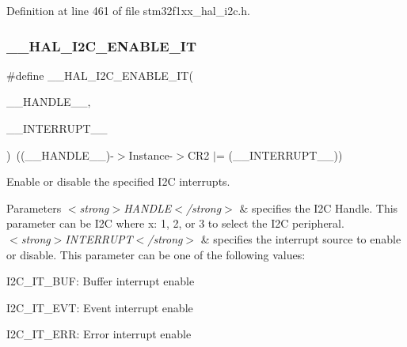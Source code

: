 Definition at line 461 of file stm32f1xx\+\_\+hal\+\_\+i2c.\+h.

\mbox{\label{group___i2_c___exported___macros_gac9d8b249b06b2d30f987acc9ceebd1d9}} 
\subsubsection{\texorpdfstring{\+\_\+\+\_\+\+H\+A\+L\+\_\+\+I2\+C\+\_\+\+E\+N\+A\+B\+L\+E\+\_\+\+IT}{\_\_HAL\_I2C\_ENABLE\_IT}}
{\footnotesize\ttfamily \#define \+\_\+\+\_\+\+H\+A\+L\+\_\+\+I2\+C\+\_\+\+E\+N\+A\+B\+L\+E\+\_\+\+IT(\begin{DoxyParamCaption}\item[{}]{\+\_\+\+\_\+\+H\+A\+N\+D\+L\+E\+\_\+\+\_\+,  }\item[{}]{\+\_\+\+\_\+\+I\+N\+T\+E\+R\+R\+U\+P\+T\+\_\+\+\_\+ }\end{DoxyParamCaption})~((\+\_\+\+\_\+\+H\+A\+N\+D\+L\+E\+\_\+\+\_\+)-\/$>$Instance-\/$>$C\+R2 $\vert$= (\+\_\+\+\_\+\+I\+N\+T\+E\+R\+R\+U\+P\+T\+\_\+\+\_\+))}



Enable or disable the specified I2C interrupts. 


\begin{DoxyParams}{Parameters}
{\em $<$strong$>$\+H\+A\+N\+D\+L\+E$<$/strong$>$} & specifies the I2C Handle. This parameter can be I2C where x\+: 1, 2, or 3 to select the I2C peripheral. \\
\hline
{\em $<$strong$>$\+I\+N\+T\+E\+R\+R\+U\+P\+T$<$/strong$>$} & specifies the interrupt source to enable or disable. This parameter can be one of the following values\+: \begin{DoxyItemize}
\item I2\+C\+\_\+\+I\+T\+\_\+\+B\+UF\+: Buffer interrupt enable \item I2\+C\+\_\+\+I\+T\+\_\+\+E\+VT\+: Event interrupt enable \item I2\+C\+\_\+\+I\+T\+\_\+\+E\+RR\+: Error interrupt enable \end{DoxyItemize}
\\
\hline
\end{DoxyParams}

